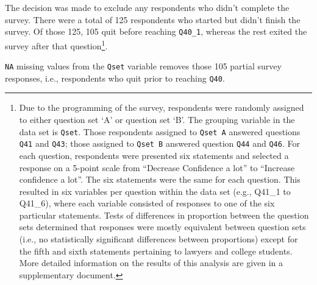 \documentclass[
  11pt,
  a4paper,
]{article}
\begin{document}
The decision was made to exclude any respondents who didn't complete the
survey. There were a total of 125 respondents who started but didn't
finish the survey. Of those 125, 105 quit before reaching
\texttt{Q40\_1}, whereas the rest exited the survey after that
question\footnote{Due to the programming of the survey, respondents were
  randomly assigned to either question set `A' or question set `B'. The
  grouping variable in the data set is \texttt{Qset}. Those respondents
  assigned to \texttt{Qset\ A} answered questions \texttt{Q41} and
  \texttt{Q43}; those assigned to \texttt{Qset\ B} answered question
  \texttt{Q44} and \texttt{Q46}. For each question, respondents were
  presented six statements and selected a response on a 5-point scale
  from ``Decrease Confidence a lot'' to ``Increase confidence a lot''.
  The six statements were the same for each question. This resulted in
  six variables per question within the data set (e.g., Q41\_1 to
  Q41\_6), where each variable consisted of responses to one of the six
  particular statements. Tests of differences in proportion between the
  question sets determined that responses were mostly equivalent between
  question sets (i.e., no statistically significant differences between
  proportions) except for the fifth and sixth statements pertaining to
  lawyers and college students. More detailed information on the results
  of this analysis are given in a supplementary document.}.

\texttt{NA} missing values from the \texttt{Qset} variable removes those
105 partial survey responses, i.e., respondents who quit prior to
reaching \texttt{Q40}.
\end{document}
